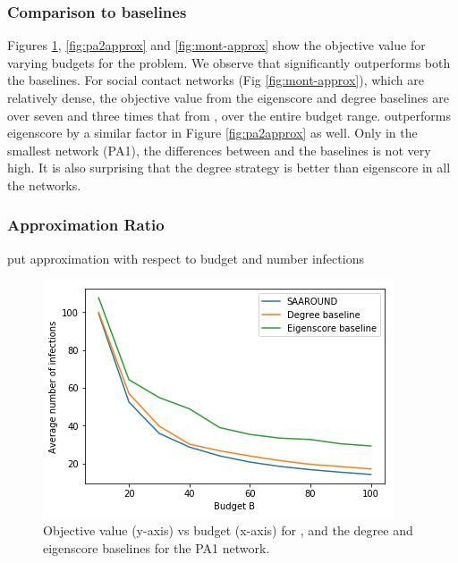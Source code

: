 \subsubsection{Comparison to baselines}
Figures \ref{fig:pa1approx}, \ref{fig:pa2approx} and \ref{fig:mont-approx} show the objective value
for varying budgets for the \probone{} problem. We observe that \algo{} significantly outperforms
both the baselines. For social contact networks (Fig \ref{fig:mont-approx}), which are relatively dense,
the objective value from the eigenscore and degree baselines are over seven and three times that from
\algo{}, over the entire budget range. \algo{} outperforms eigenscore by a similar factor in Figure \ref{fig:pa2approx} as well.
Only in the smallest network (PA1), the differences between \algo{} and the baselines is not very high.
It is also surprising that the degree strategy is better than eigenscore in all the networks.

\subsubsection{Approximation Ratio}

put approximation with respect to budget and number infections

\begin{figure}[!h]
    \centering
    \includegraphics[scale = 0.55]{Figuresnew/pa1_obj.png}
    \caption{Objective value (y-axis) vs budget (x-axis) for \algo{}, and the degree and eigenscore baselines for the PA1 network.}
    \label{fig:pa1approx}
\end{figure}


